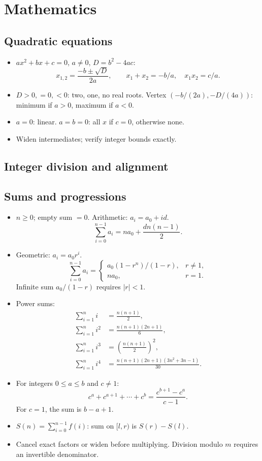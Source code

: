 \chapter{Mathematics}

\section{Quadratic equations}
\begin{itemize}[nosep,leftmargin=*]
\item $ax^2+bx+c=0$, $a\ne0$, $D=b^2-4ac$:
\[
 x_{1,2}=\frac{-b\pm\sqrt D}{2a},\qquad
 x_1+x_2=-b/a,\quad x_1x_2=c/a.
\]
\item $D>0,=0,<0$: two, one, no real roots.
Vertex $(-b/(2a),-D/(4a))$: minimum if $a>0$, maximum if $a<0$.
\item $a=0$: linear. $a=b=0$: all $x$ if $c=0$, otherwise none.
\item Widen intermediates; verify integer bounds exactly.
\end{itemize}

\section{Integer division and alignment}

\section{Sums and progressions}
\begin{itemize}[nosep,leftmargin=*]
\item $n\ge0$; empty sum $=0$. Arithmetic: $a_i=a_0+id$.
\[
 \sum_{i=0}^{n-1}a_i=na_0+\frac{dn(n-1)}2.
\]
\item Geometric: $a_i=a_0r^i$.
\[
 \sum_{i=0}^{n-1}a_i=
 \begin{cases}a_0(1-r^n)/(1-r),&r\ne1,\\na_0,&r=1.\end{cases}
\]
Infinite sum $a_0/(1-r)$ requires $|r|<1$.
\item Power sums:
\[
 \begin{aligned}
 \sum_{i=1}^n i&=\frac{n(n+1)}2,\\
 \sum_{i=1}^n i^2&=\frac{n(n+1)(2n+1)}6,\\
 \sum_{i=1}^n i^3&=\left(\frac{n(n+1)}2\right)^2,\\
 \sum_{i=1}^n i^4&=\frac{n(n+1)(2n+1)(3n^2+3n-1)}{30}.
 \end{aligned}
\]
\item For integers $0\le a\le b$ and $c\ne1$:
\[
 c^a+c^{a+1}+\cdots+c^b=\frac{c^{b+1}-c^a}{c-1}.
\]
For $c=1$, the sum is $b-a+1$.
\item $S(n)=\sum_{i=0}^{n-1}f(i)$: sum on $[l,r)$ is $S(r)-S(l)$.
\item Cancel exact factors or widen before multiplying.
Division modulo $m$ requires an invertible denominator.
\end{itemize}

